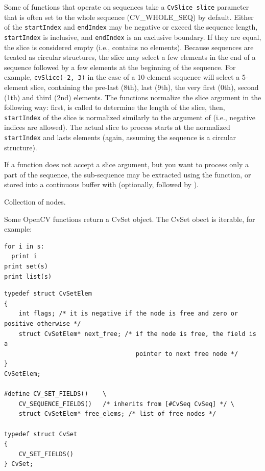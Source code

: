 Some of functions that operate on sequences take a \texttt{CvSlice slice}
parameter that is often set to the whole sequence (CV\_WHOLE\_SEQ) by
default. Either of the \texttt{startIndex} and \texttt{endIndex}
may be negative or exceed the sequence length, \texttt{startIndex} is
inclusive, and \texttt{endIndex} is an exclusive boundary. If they are equal,
the slice is considered empty (i.e., contains no elements). Because
sequences are treated as circular structures, the slice may select a
few elements in the end of a sequence followed by a few elements at the
beginning of the sequence. For example, \texttt{cvSlice(-2, 3)} in the case of
a 10-element sequence will select a 5-element slice, containing the pre-last
(8th), last (9th), the very first (0th), second (1th) and third (2nd)
elements. The functions normalize the slice argument in the following way:
first,  is called to determine the length of the slice,
then, \texttt{startIndex} of the slice is normalized similarly to the
argument of  (i.e., negative indices are allowed). The
actual slice to process starts at the normalized \texttt{startIndex}
and lasts  elements (again, assuming the sequence is
a circular structure).

If a function does not accept a slice argument, but you want to process
only a part of the sequence, the sub-sequence may be extracted
using the  function, or stored into a continuous
buffer with  (optionally, followed by
).

\fi

\label{CvSet}
Collection of nodes.

\ifPy
Some OpenCV functions return a CvSet object. The CvSet obect is iterable, for example:

\begin{lstlisting}
for i in s:
  print i
print set(s)
print list(s)
\end{lstlisting}

\fi

\ifC
\begin{lstlisting}
typedef struct CvSetElem
{
    int flags; /* it is negative if the node is free and zero or positive otherwise */
    struct CvSetElem* next_free; /* if the node is free, the field is a
                                    pointer to next free node */
}
CvSetElem;

#define CV_SET_FIELDS()    \
    CV_SEQUENCE_FIELDS()   /* inherits from [#CvSeq CvSeq] */ \
    struct CvSetElem* free_elems; /* list of free nodes */

typedef struct CvSet
{
    CV_SET_FIELDS()
} CvSet;
\end{lstlisting}

